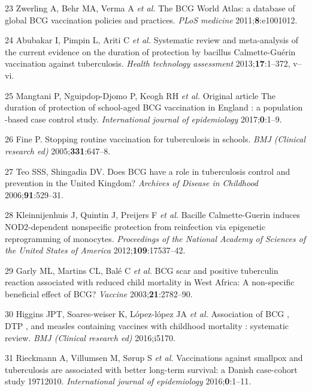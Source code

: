 \documentclass[11pt,twoside]{bristolthesis}
\begin{document}
  \leavevmode\hypertarget{ref-Zwerling2011}{}%
  23 Zwerling A, Behr MA, Verma A \emph{et al.} The BCG World Atlas: a database of global BCG vaccination policies and practices. \emph{PLoS medicine} 2011;\textbf{8}:e1001012.
  
  \leavevmode\hypertarget{ref-Abubakar2013}{}%
  24 Abubakar I, Pimpin L, Ariti C \emph{et al.} Systematic review and meta-analysis of the current evidence on the duration of protection by bacillus Calmette-Guérin vaccination against tuberculosis. \emph{Health technology assessment} 2013;\textbf{17}:1--372, v--vi.
  
  \leavevmode\hypertarget{ref-Mangtani2017}{}%
  25 Mangtani P, Nguipdop-Djomo P, Keogh RH \emph{et al.} Original article The duration of protection of school-aged BCG vaccination in England : a population -based case control study. \emph{International journal of epidemiology} 2017;\textbf{0}:1--9.
  
  \leavevmode\hypertarget{ref-Fine2005a}{}%
  26 Fine P. Stopping routine vaccination for tuberculosis in schools. \emph{BMJ (Clinical research ed)} 2005;\textbf{331}:647--8.
  
  \leavevmode\hypertarget{ref-Teo2006}{}%
  27 Teo SSS, Shingadia DV. Does BCG have a role in tuberculosis control and prevention in the United Kingdom? \emph{Archives of Disease in Childhood} 2006;\textbf{91}:529--31.
  
  \leavevmode\hypertarget{ref-Kleinnijenhuis2012}{}%
  28 Kleinnijenhuis J, Quintin J, Preijers F \emph{et al.} Bacille Calmette-Guerin induces NOD2-dependent nonspecific protection from reinfection via epigenetic reprogramming of monocytes. \emph{Proceedings of the National Academy of Sciences of the United States of America} 2012;\textbf{109}:17537--42.
  
  \leavevmode\hypertarget{ref-Garly2003}{}%
  29 Garly ML, Martins CL, Balé C \emph{et al.} BCG scar and positive tuberculin reaction associated with reduced child mortality in West Africa: A non-specific beneficial effect of BCG? \emph{Vaccine} 2003;\textbf{21}:2782--90.
  
  \leavevmode\hypertarget{ref-Higgins}{}%
  30 Higgins JPT, Soares-weiser K, López-lópez JA \emph{et al.} Association of BCG , DTP , and measles containing vaccines with childhood mortality : systematic review. \emph{BMJ (Clinical research ed)} 2016;i5170.
  
  \leavevmode\hypertarget{ref-Rieckmann2016}{}%
  31 Rieckmann A, Villumsen M, Sørup S \emph{et al.} Vaccinations against smallpox and tuberculosis are associated with better long-term survival: a Danish case-cohort study 19712010. \emph{International journal of epidemiology} 2016;\textbf{0}:1--11.
  
\end{document}
